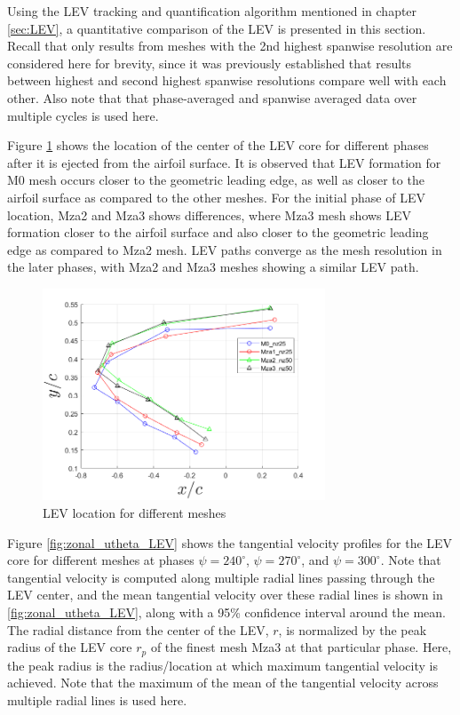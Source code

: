 Using the LEV tracking and quantification algorithm mentioned in chapter \ref{sec:LEV}, a quantitative comparison of the LEV is presented in this section. 
Recall that only results from meshes with the 2nd highest spanwise resolution are considered here for brevity, since it was previously established that results between highest and second highest spanwise resolutions compare well with each other. 
Also note that that phase-averaged and spanwise averaged data over multiple cycles is used here.

Figure \ref{fig:zonal_LEV_location} shows the location of the center of the LEV core for different phases after it is ejected from the airfoil surface. 
It is observed that LEV formation for M0 mesh occurs closer to the geometric leading edge, as well as closer to the airfoil surface as compared to the other meshes.
For the initial phase of LEV location, Mza2 and Mza3 shows differences, where Mza3 mesh shows LEV formation closer to the airfoil surface and also closer to the geometric leading edge as compared to Mza2 mesh.
LEV paths converge as the mesh resolution in the later phases, with Mza2 and Mza3 meshes showing a similar LEV path.


\begin{figure}[H]
	\centering
	\includegraphics[width=0.75\textwidth]{figures/zonal_adapt_results/LEV/LEV_location}
	\caption{ LEV location for different meshes}
	\label{fig:zonal_LEV_location}
\end{figure}

Figure \ref{fig:zonal_utheta_LEV} shows the tangential velocity profiles for the LEV core for different meshes at phases  $\psi = 240^\circ$,  $\psi = 270^\circ$, and  $\psi = 300^\circ$. 
Note that tangential velocity is computed along multiple radial lines passing through the LEV center, and the mean tangential velocity over these radial lines is shown in \ref{fig:zonal_utheta_LEV}, along with a 95\% confidence interval around the mean.
The radial distance from the center of the LEV, $r$, is normalized by the peak radius of the LEV core $r_p$ of the finest mesh Mza3 at that particular phase. 
Here, the peak radius is the radius/location at which maximum tangential velocity is achieved. 
Note that the maximum of the mean of the tangential velocity across multiple radial lines is used here. 

